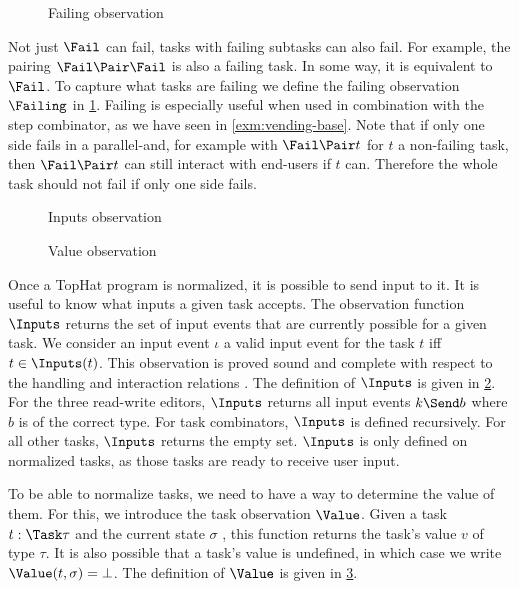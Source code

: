 \begin{figure}
  \caption{Failing observation}
  \label{fig:observation-failing}
\end{figure}

Not just $\Fail$ can fail, tasks with failing subtasks can also fail.
For example, the pairing $\Fail \Pair \Fail$ is also a failing task.
In some way, it is equivalent to $\Fail$.
To capture what tasks are failing we define the failing observation $\Failing$ in \cref{fig:observation-failing}.
Failing is especially useful when used in combination with the step combinator,
as we have seen in \cref{exm:vending-base}.
Note that if only one side fails in a parallel-and,
for example with $\Fail \Pair t$ for $t$ a non-failing task,
then $\Fail \Pair t$ can still interact with end-users if $t$ can.
Therefore the whole task should not fail if only one side fails.

\begin{figure}
  \caption{Inputs observation}
  \label{fig:observation-inputs}
\end{figure}

\begin{figure}[b]
  \caption{Value observation}
  \label{fig:observation-value}
\end{figure}

Once a TopHat program is normalized, it is possible to send input to it.
It is useful to know what inputs a given task accepts.
The observation function $\Inputs$ returns the set of input events that are currently possible for a given task.
We consider an input event $\iota$ a valid input event for the task $t$ iff $t \in \Inputs(t)$.
This observation is proved sound and complete with respect to the handling and interaction relations \cite{Steenvoorden22}.
The definition of $\Inputs$ is given in \cref{fig:observation-inputs}.
For the three read-write editors, $\Inputs$ returns all input events $k \Send b$ where $b$ is of the correct type.
For task combinators, $\Inputs$ is defined recursively.
For all other tasks, $\Inputs$ returns the empty set.
$\Inputs$ is only defined on normalized tasks, as those tasks are ready to receive user input.

To be able to normalize tasks, we need to have a way to determine the value of them.
For this, we introduce the task observation $\Value$.
Given a task $t:\Task\tau$ and the current state $\sigma$ ,
this function returns the task's value $v$ of type $\tau$.
It is also possible that a task's value is undefined, in which case we write $\Value(t,\sigma) = \bot$.
The definition of $\Value$ is given in \cref{fig:observation-value}.